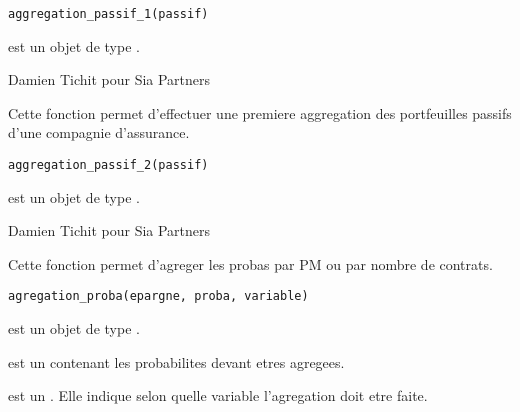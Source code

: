 \documentclass[a4paper]{book}
\begin{document}
%
\begin{Usage}
\begin{verbatim}
aggregation_passif_1(passif)
\end{verbatim}
\end{Usage}
%
\begin{Arguments}
\begin{ldescription}
\item[\code{passif}] est un objet de type .
\end{ldescription}
\end{Arguments}
%
\begin{Author}\relax
Damien Tichit pour Sia Partners
\end{Author}
%
\begin{Description}\relax
Cette fonction permet d'effectuer une premiere aggregation des portfeuilles passifs d'une compagnie d'assurance.
\end{Description}
%
\begin{Usage}
\begin{verbatim}
aggregation_passif_2(passif)
\end{verbatim}
\end{Usage}
%
\begin{Arguments}
\begin{ldescription}
\item[\code{passif}] est un objet de type .
\end{ldescription}
\end{Arguments}
%
\begin{Author}\relax
Damien Tichit pour Sia Partners
\end{Author}
%
\begin{Description}\relax
Cette fonction permet d'agreger les probas par PM ou par nombre de contrats.
\end{Description}
%
\begin{Usage}
\begin{verbatim}
agregation_proba(epargne, proba, variable)
\end{verbatim}
\end{Usage}
%
\begin{Arguments}
\begin{ldescription}
\item[\code{epargne}] est un objet de type .

\item[\code{proba}] est un  contenant les probabilites devant etres agregees.

\item[\code{variable}] est un . Elle indique selon quelle variable l'agregation doit etre faite.
\end{ldescription}
\end{Arguments}
\end{document}
